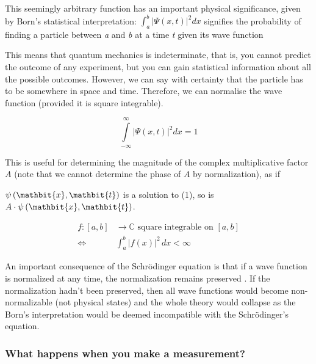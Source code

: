 \documentclass{article}
\begin{document}
This seemingly arbitrary function has an important physical significance, given by Born's statistical interpretation: $\int_a^b |\Psi(x,t)|^2 dx$ signifies the probability of finding a particle between \textit{a} and \textit{b} at a time \textit{t} given its wave function


This means that quantum mechanics is indeterminate, that is, you cannot predict the outcome of any experiment, but you can gain statistical information about all the possible outcomes. However, we can say with certainty that the particle has to be somewhere in space and time. Therefore, we can normalise the wave function (provided it is square integrable).

\begin{equation}
\int\limits_{-\infty}^\infty |\Psi(x,t)|^2 dx = 1
\label{eq:2}
\end{equation}

This is useful for determining the magnitude of the complex multiplicative factor $A$ (note that we cannot determine the phase of $A$ by normalization), as if 

$\psi\left(\mathbit{x},\mathbit{t}\right)$ is a solution to (1), so is 
$A\cdot{\psi}\left(\mathbit{x},\mathbit{t}\right)$. 




\begin{align}
f:[a,b] &\to \mathbb{C} \text{ square integrable on } [a,b] \\
\iff \quad &\int_{a}^{b} |f(x)|^{2} \, dx < \infty
\end{align}


An important consequence of the Schrödinger equation is that if a wave function is normalized at any time, the normalization remains preserved  \cite{Griffiths2004Introduction}.  If the normalization hadn't been preserved, then all wave functions would become non-normalizable (not physical states) and the whole theory would collapse as the Born's interpretation would be deemed incompatible with the Schr\"{o}dinger's equation.


\subsubsection{\Large What happens when you make a measurement?}
\end{document}
